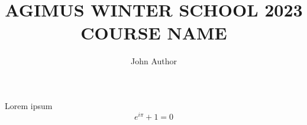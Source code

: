 \documentclass[
    xcolor={dvipsnames},
    aspectratio=169
]{beamer}
\title{%
    {\small AGIMUS WINTER SCHOOL 2023}\\
    \texorpdfstring{\MakeUppercase{Course Name}}{Course name}
}
\author{John Author}
\institute{Institute}
\date{}
\begin{document}
\maketitle

\begin{frame}{Lorem ipsum}
    \lipsum[1]
    $$
        e^{i\pi} + 1 = 0
    $$
\end{frame}

\nocite{*}

\begin{frame}
    \printbibliography{}
\end{frame}
\end{document}
